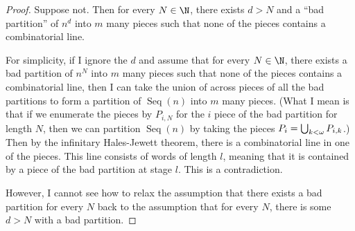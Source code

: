 \documentclass[11pt]{article}
\newcommand{\Seq}{\operatorname{Seq}}
\begin{document}
\begin{proof}
    Suppose not.
    Then for every $N \in \N$, there exists $d > N$ and a ``bad partition'' of
    $n^d$ into $m$ many pieces such that none of the pieces contains a
    combinatorial line.

    For simplicity, if I ignore the $d$ and assume that for every $N \in \N$,
    there exists a bad partition of $n^N$ into $m$ many pieces such that none
    of the pieces contains a combinatorial line, then I can take the union of
    across pieces of all the bad partitions to form a partition of $\Seq(n)$
    into $m$ many pieces.
    (What I mean is that if we enumerate the pieces by $P_{i,N}$ for the
    $i$\th{} piece of the bad partition for length $N$, then we can partition
    $\Seq(n)$ by taking the pieces $P_i = \bigcup_{k < \omega} P_{i,k}$.)
    Then by the infinitary Hales-Jewett theorem, there is a
    combinatorial line in one of the pieces. This line consists of words of
    length $l$, meaning that it is contained by a piece of the bad partition at
    stage $l$. This is a contradiction.

    However, I cannot see how to relax the assumption that there exists a bad
    partition for every $N$ back to the assumption that for every $N$, there is
    some $d > N$ with a bad partition.
\end{proof}
\end{document}
